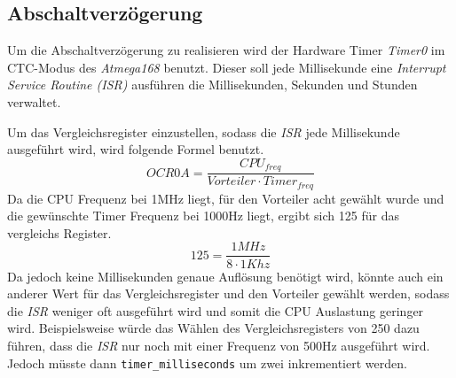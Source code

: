   \subsection{Abschaltverzögerung}
    Um die Abschaltverzögerung zu realisieren wird der Hardware Timer
    \textit{Timer0} im CTC-Modus des \textit{Atmega168} benutzt.
    Dieser soll jede Millisekunde eine \textit{Interrupt Service Routine (ISR)}
    ausführen die Millisekunden, Sekunden und Stunden verwaltet.
    
    Um das Vergleichsregister einzustellen, sodass die
    \textit{ISR} jede Millisekunde ausgeführt wird, wird folgende Formel
    benutzt.
    $$ OCR0A = \frac{CPU_{freq}}{Vorteiler \cdot Timer_{freq}} $$
    Da die CPU Frequenz bei 1MHz liegt, für den Vorteiler acht gewählt
    wurde und die gewünschte Timer Frequenz bei 1000Hz liegt, ergibt
    sich 125 für das vergleichs Register.
    $$ 125 = \frac{1MHz}{8 \cdot 1Khz} $$
    Da jedoch keine Millisekunden genaue Auflösung benötigt wird, könnte
    auch ein anderer Wert für das Vergleichsregister und den Vorteiler
    gewählt werden, sodass die \textit{ISR} weniger oft ausgeführt wird
    und somit die CPU Auslastung geringer wird.
    Beispielsweise würde das Wählen des Vergleichsregisters von 250
    dazu führen, dass die \textit{ISR} nur noch mit einer Frequenz von
    500Hz ausgeführt wird. Jedoch müsste dann \texttt{timer\_milliseconds} um zwei
    inkrementiert werden.
